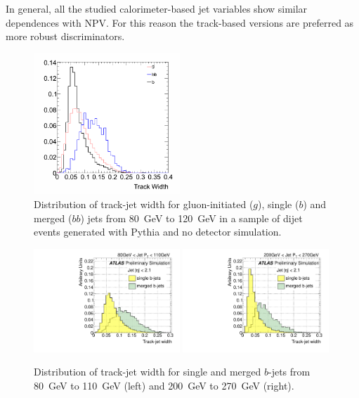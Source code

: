  In general, all the studied calorimeter-based jet variables show similar dependences with NPV. For this reason the track-based versions are preferred as more robust discriminators.


\begin{figure}[tp]
\centering
\includegraphics[width=0.49\textwidth]{FIGS/TEMPFigs/PythisStandalone/MaxPlots/trkWidth_bb_b_g_J3_PT80.png}
\caption{Distribution of track-jet width for gluon-initiated ($g$), single ($b$) and merged ($bb$) jets from 80~GeV to 120~GeV in a sample of dijet events generated with {\sc Pythia} and no detector simulation.}
\label{fig:trkwidthsinglemergedPYTHIAgluon}
\end{figure}

\begin{figure}[tp]
\centering
\includegraphics[width=0.49\textwidth]{FIGS/VarsSingleMerged/trkWidth080.pdf}
\includegraphics[width=0.49\textwidth]{FIGS/VarsSingleMerged/trkWidth200.pdf}
\caption{Distribution of track-jet width for single and merged $b$-jets from 80~GeV to 110~GeV (left) and 200~GeV to 270~GeV (right).}
\label{fig:trkwidthsinglemerged}
\end{figure}


